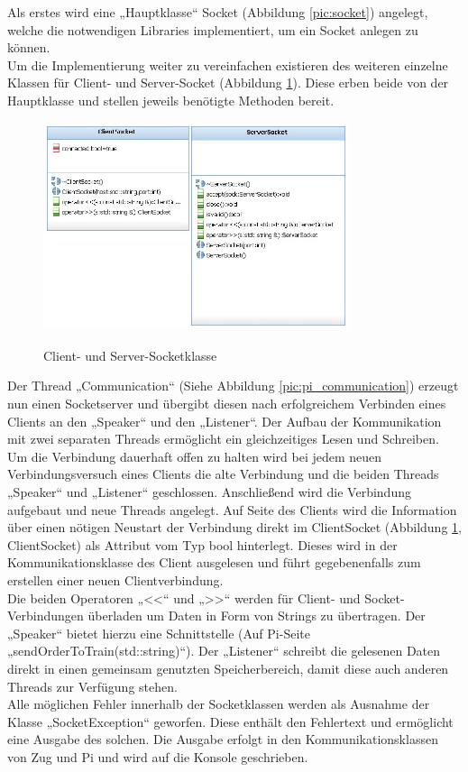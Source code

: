 Als erstes wird eine „Hauptklasse“ Socket (Abbildung \ref{pic:socket}) angelegt, welche die notwendigen Libraries implementiert, um ein Socket anlegen zu können.\\
Um die Implementierung weiter zu vereinfachen existieren des weiteren einzelne Klassen für Client- und Server-Socket (Abbildung \ref{pic:server_client}). Diese erben beide von der Hauptklasse und stellen jeweils benötigte Methoden bereit. \\
\begin{figure}
	\caption{Client- und Server-Socketklasse}
	\includegraphics[width=0.8\textwidth]{content/pictures/socket/server_client_socket.jpg}
	\label{pic:server_client}
\end{figure}
Der Thread „Communication“ (Siehe Abbildung \ref{pic:pi_communication}) erzeugt nun einen Socketserver und übergibt diesen nach erfolgreichem Verbinden eines Clients an den „Speaker“ und den „Listener“. Der Aufbau der Kommunikation mit zwei separaten Threads ermöglicht ein gleichzeitiges Lesen und Schreiben.\\
Um die Verbindung dauerhaft offen zu halten wird bei jedem neuen Verbindungsversuch eines Clients die alte Verbindung und die beiden Threads „Speaker“ und „Listener“ geschlossen. Anschließend wird die Verbindung aufgebaut und neue Threads angelegt. Auf Seite des Clients wird die Information über einen nötigen Neustart der Verbindung direkt im ClientSocket (Abbildung \ref{pic:server_client}, ClientSocket) als Attribut vom Typ bool hinterlegt. Dieses wird in der Kommunikationsklasse des Client ausgelesen und führt gegebenenfalls zum erstellen einer neuen Clientverbindung.\\
Die beiden Operatoren  „<<“ und „>>“ werden für Client- und Socket-Verbindungen überladen um Daten in Form von Strings zu übertragen. Der „Speaker“ bietet hierzu eine Schnittstelle (Auf Pi-Seite „sendOrderToTrain(std::string)“). Der „Listener“ schreibt die gelesenen Daten direkt in einen gemeinsam genutzten Speicherbereich, damit diese auch anderen Threads zur Verfügung stehen.\\
Alle möglichen Fehler innerhalb der Socketklassen werden als Ausnahme der Klasse „SocketException“ geworfen. Diese enthält den Fehlertext und ermöglicht eine Ausgabe des solchen. Die Ausgabe erfolgt in den Kommunikationsklassen von Zug und Pi und wird auf die Konsole geschrieben.






